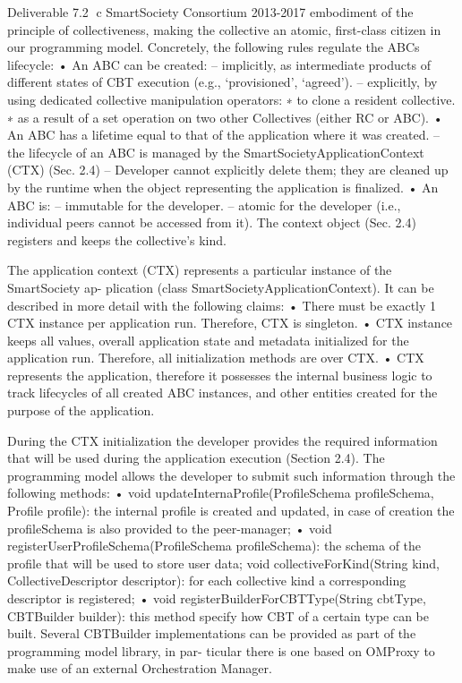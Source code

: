 Deliverable 7.2 ⃝c SmartSociety Consortium 2013-2017
embodiment of the principle of collectiveness, making the collective an atomic, first-class citizen in our programming model. Concretely, the following rules regulate the ABCs lifecycle:
• An ABC can be created:
– implicitly, as intermediate products of different states of CBT execution (e.g.,
‘provisioned’, ‘agreed’).
– explicitly, by using dedicated collective manipulation operators:
∗ to clone a resident collective.
∗ as a result of a set operation on two other Collectives (either RC or ABC).
• An ABC has a lifetime equal to that of the application where it was created.
– the lifecycle of an ABC is managed by the SmartSocietyApplicationContext
(CTX) (Sec. 2.4)
– Developer cannot explicitly delete them; they are cleaned up by the runtime when the object representing the application is finalized.
• An ABC is:
– immutable for the developer.
– atomic for the developer (i.e., individual peers cannot be accessed from it).
The context object (Sec. 2.4) registers and keeps the collective’s kind. 

The application context (CTX) represents a particular instance of the SmartSociety ap- plication (class SmartSocietyApplicationContext). It can be described in more detail with the following claims:
• There must be exactly 1 CTX instance per application run. Therefore, CTX is singleton.
• CTX instance keeps all values, overall application state and metadata initialized for the application run. Therefore, all initialization methods are over CTX.
• CTX represents the application, therefore it possesses the internal business logic to track lifecycles of all created ABC instances, and other entities created for the purpose of the application.

During the CTX initialization the developer provides the required information that will be used during the application execution (Section 2.4). The programming model allows the developer to submit such information through the following methods:
• void updateInternaProfile(ProfileSchema profileSchema, Profile profile): the internal profile is created and updated, in case of creation the profileSchema is also provided to the peer-manager;
• void registerUserProfileSchema(ProfileSchema profileSchema): the schema of the profile that will be used to store user data;
void collectiveForKind(String kind, CollectiveDescriptor descriptor): for each collective kind a corresponding descriptor is registered;
• void registerBuilderForCBTType(String cbtType, CBTBuilder builder): this method specify how CBT of a certain type can be built. Several CBTBuilder implementations can be provided as part of the programming model library, in par- ticular there is one based on OMProxy to make use of an external Orchestration Manager.

